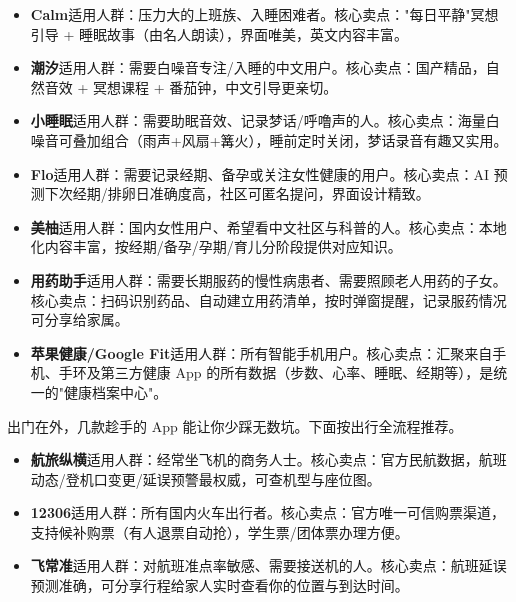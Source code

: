 
\begin{itemize}
  \item \textbf{Calm}适用人群：压力大的上班族、入睡困难者。核心卖点："每日平静"冥想引导 + 睡眠故事（由名人朗读），界面唯美，英文内容丰富。
  \item \textbf{潮汐}适用人群：需要白噪音专注/入睡的中文用户。核心卖点：国产精品，自然音效 + 冥想课程 + 番茄钟，中文引导更亲切。
  \item \textbf{小睡眠}适用人群：需要助眠音效、记录梦话/呼噜声的人。核心卖点：海量白噪音可叠加组合（雨声+风扇+篝火），睡前定时关闭，梦话录音有趣又实用。
\end{itemize}


\begin{itemize}
  \item \textbf{Flo}适用人群：需要记录经期、备孕或关注女性健康的用户。核心卖点：AI 预测下次经期/排卵日准确度高，社区可匿名提问，界面设计精致。
  \item \textbf{美柚}适用人群：国内女性用户、希望看中文社区与科普的人。核心卖点：本地化内容丰富，按经期/备孕/孕期/育儿分阶段提供对应知识。
\end{itemize}


\begin{itemize}
  \item \textbf{用药助手}适用人群：需要长期服药的慢性病患者、需要照顾老人用药的子女。核心卖点：扫码识别药品、自动建立用药清单，按时弹窗提醒，记录服药情况可分享给家属。
\end{itemize}


\begin{itemize}
  \item \textbf{苹果健康/Google Fit}适用人群：所有智能手机用户。核心卖点：汇聚来自手机、手环及第三方健康 App 的所有数据（步数、心率、睡眠、经期等），是统一的"健康档案中心"。
\end{itemize}


出门在外，几款趁手的 App 能让你少踩无数坑。下面按出行全流程推荐。


\begin{itemize}
  \item \textbf{航旅纵横}适用人群：经常坐飞机的商务人士。核心卖点：官方民航数据，航班动态/登机口变更/延误预警最权威，可查机型与座位图。
  \item \textbf{12306}适用人群：所有国内火车出行者。核心卖点：官方唯一可信购票渠道，支持候补购票（有人退票自动抢），学生票/团体票办理方便。
  \item \textbf{飞常准}适用人群：对航班准点率敏感、需要接送机的人。核心卖点：航班延误预测准确，可分享行程给家人实时查看你的位置与到达时间。
\end{itemize}

